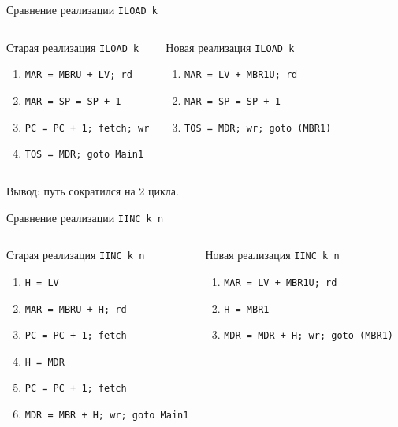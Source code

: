 \begin{frame}{Сравнение реализации \texttt{ILOAD k}}
\small
\begin{columns}
    \column{5.5cm}
    \begin{block}{Старая реализация \texttt{ILOAD k}}
    \begin{enumerate}
        \item \texttt{MAR = MBRU + LV; rd}
        \item \texttt{MAR = SP = SP + 1}
        \item \texttt{PC = PC + 1; fetch; wr}
        \item \texttt{TOS = MDR; goto~Main1}
    \end{enumerate}
    \end{block}

    \pause
    \column{6cm}
    \begin{block}{Новая реализация \texttt{ILOAD k}}
    \begin{enumerate}
        \item \texttt{MAR = LV + MBR1U; rd}
        \item \texttt{MAR = SP = SP + 1}
        \item \texttt{TOS = MDR; wr; goto~(MBR1)}
    \end{enumerate}
    \end{block}
\end{columns}

\vspace{1cm}
Вывод: путь сократился на 2 цикла.
\end{frame}

\begin{frame}{Сравнение реализации \texttt{IINC k n}}
\begin{columns}
    \column{5.7cm}
    \begin{block}{Старая реализация \texttt{IINC k n}}
    \pause
    \begin{enumerate}
        \item \texttt{H = LV}
        \item \texttt{MAR = MBRU + H; rd}
        \item \texttt{PC = PC + 1; fetch}
        \item \texttt{H = MDR}
        \item \texttt{PC = PC + 1; fetch}
        \item \texttt{MDR = MBR + H; wr; goto Main1}
    \end{enumerate}
    \end{block}

    \pause
    \column{5.7cm}
    \begin{block}{Новая реализация \texttt{IINC k n}}
    \begin{enumerate}
        \item \texttt{MAR = LV + MBR1U; rd}
        \item \texttt{H = MBR1}
        \item \texttt{MDR = MDR + H; wr; goto (MBR1)}
    \end{enumerate}
    \end{block}
\end{columns}
\end{frame}

